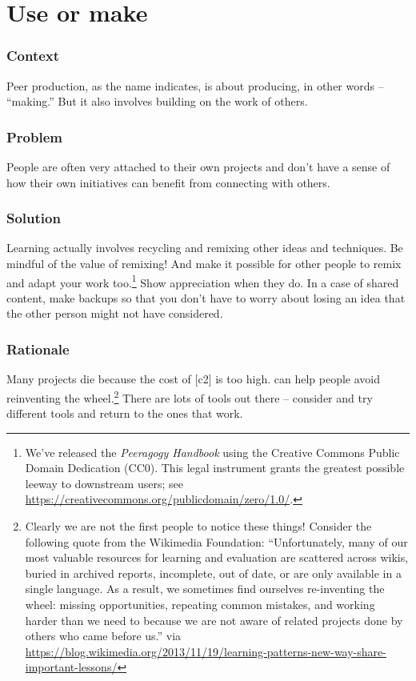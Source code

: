 \section{Use or make}\label{sec:Use_or_make}
\subsubsection*{Context}
Peer production, as the name indicates, is about producing, in other words --
``making.'' But it also involves building on the work of others.

\subsubsection*{Problem}
People are often very attached to their own projects and don't have a sense of how their own initiatives can benefit from connecting with others.

\subsubsection*{Solution} Learning actually involves recycling and remixing other ideas and techniques. Be mindful of the value of remixing!  And make it possible for other people to remix and adapt your work too.\footnote{We've released the \emph{Peeragogy Handbook} using the Creative Commons Public Domain Dedication (CC0).  This legal instrument grants the greatest possible leeway to downstream users; see \url{https://creativecommons.org/publicdomain/zero/1.0/}.}  Show appreciation when they do.  In a case of shared content, make backups so that you don't have to worry about losing an idea that the other person might not have considered.

\subsubsection*{Rationale} 
Many projects die because the cost of  [c2] is too high.   can help people avoid reinventing the wheel.\footnote{Clearly we are not the first people to notice these things!  Consider the following quote from the Wikimedia Foundation: ``Unfortunately, many of our most valuable resources for learning and evaluation are scattered across wikis, buried in archived reports, incomplete, out of date, or are only available in a single language. As a result, we sometimes find ourselves re-inventing the wheel: missing opportunities, repeating common mistakes, and working harder than we need to because we are not aware of related projects done by others who came before us.'' via \url{https://blog.wikimedia.org/2013/11/19/learning-patterns-new-way-share-important-lessons/}}  There are lots of tools out there -- consider and try different tools and return to the ones that work.


